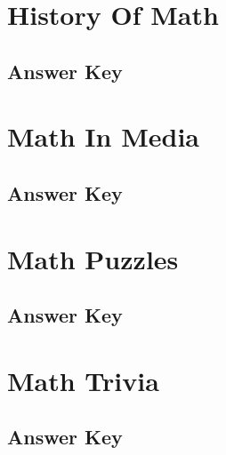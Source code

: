 \documentclass[12pt,a4paper]{book}
\newcounter{totalcounter}
\begin{document}
\setcounter{totalcounter}{1}

\section{History Of Math}



\subsection*{Answer Key}



\setcounter{totalcounter}{1}

\section{Math In Media}



\subsection*{Answer Key}



\setcounter{totalcounter}{1}

\section{Math Puzzles}



\subsection*{Answer Key}



\setcounter{totalcounter}{1}

\section{Math Trivia}



\subsection*{Answer Key}
\end{document}
